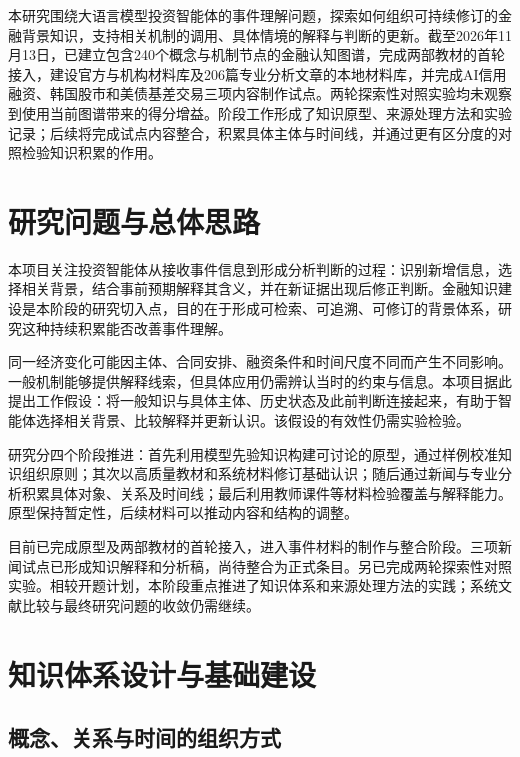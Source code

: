 \documentclass[11pt,letterpaper]{article}
\begin{document}
\reporttitle

本研究围绕大语言模型投资智能体的事件理解问题，探索如何组织可持续修订的金融背景知识，支持相关机制的调用、具体情境的解释与判断的更新。截至2026年11月13日，已建立包含240个概念与机制节点的金融认知图谱，完成两部教材的首轮接入，建设官方与机构材料库及206篇专业分析文章的本地材料库，并完成AI信用融资、韩国股市和美债基差交易三项内容制作试点。两轮探索性对照实验均未观察到使用当前图谱带来的得分增益。阶段工作形成了知识原型、来源处理方法和实验记录；后续将完成试点内容整合，积累具体主体与时间线，并通过更有区分度的对照检验知识积累的作用。

\section{研究问题与总体思路}

本项目关注投资智能体从接收事件信息到形成分析判断的过程：识别新增信息，选择相关背景，结合事前预期解释其含义，并在新证据出现后修正判断。金融知识建设是本阶段的研究切入点，目的在于形成可检索、可追溯、可修订的背景体系，研究这种持续积累能否改善事件理解。

同一经济变化可能因主体、合同安排、融资条件和时间尺度不同而产生不同影响。一般机制能够提供解释线索，但具体应用仍需辨认当时的约束与信息。本项目据此提出工作假设：将一般知识与具体主体、历史状态及此前判断连接起来，有助于智能体选择相关背景、比较解释并更新认识。该假设的有效性仍需实验检验。

研究分四个阶段推进：首先利用模型先验知识构建可讨论的原型，通过样例校准知识组织原则；其次以高质量教材和系统材料修订基础认识；随后通过新闻与专业分析积累具体对象、关系及时间线；最后利用教师课件等材料检验覆盖与解释能力。原型保持暂定性，后续材料可以推动内容和结构的调整。

目前已完成原型及两部教材的首轮接入，进入事件材料的制作与整合阶段。三项新闻试点已形成知识解释和分析稿，尚待整合为正式条目。另已完成两轮探索性对照实验。相较开题计划，本阶段重点推进了知识体系和来源处理方法的实践；系统文献比较与最终研究问题的收敛仍需继续。

\newpage
\section{知识体系设计与基础建设}

\subsection{概念、关系与时间的组织方式}
\end{document}

